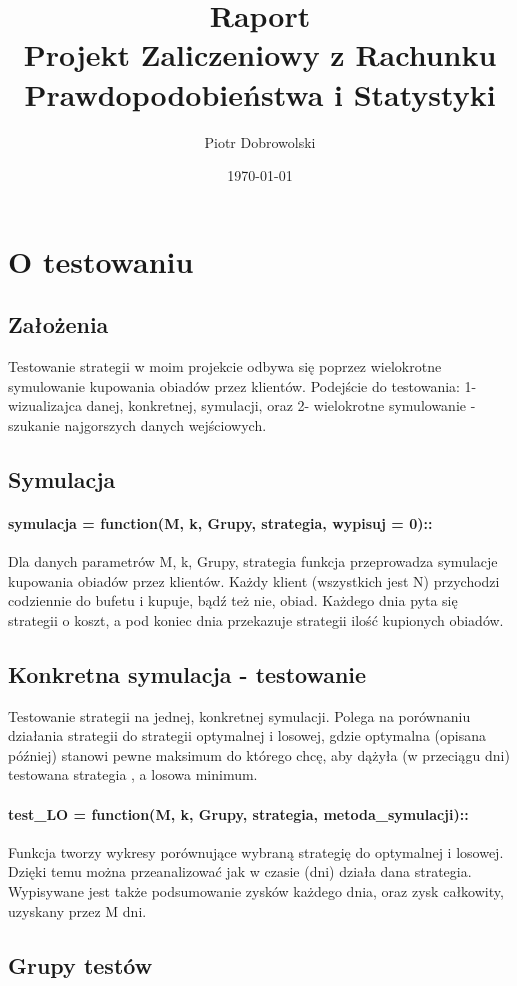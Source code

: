 \documentclass{article}
\author{Piotr Dobrowolski}
\title{Raport \\{\small Projekt Zaliczeniowy z Rachunku Prawdopodobieństwa i Statystyki} }
\date{\today}
\begin{document}
\maketitle
\tableofcontents
\section{O testowaniu}
\subsection{Założenia}
Testowanie strategii w moim projekcie odbywa się poprzez wielokrotne symulowanie kupowania
obiadów przez klientów. Podejście do testowania: 1-wizualizajca danej, konkretnej, symulacji, oraz 2-
wielokrotne symulowanie - szukanie najgorszych danych wejściowych.
\subsection{Symulacja}
\paragraph{symulacja = function(M, k, Grupy, strategia, wypisuj = 0)::} Dla danych parametrów M, k, Grupy, strategia
funkcja przeprowadza symulacje kupowania obiadów przez klientów. Każdy klient (wszystkich jest N) przychodzi codziennie
do bufetu i kupuje, bądź też nie, obiad. Każdego dnia pyta się strategii o koszt, a pod koniec dnia przekazuje
strategii ilość kupionych obiadów.
\subsection{Konkretna symulacja - testowanie}
Testowanie strategii na jednej, konkretnej symulacji. Polega na porównaniu działania strategii do strategii optymalnej
i losowej, gdzie optymalna (opisana później) stanowi pewne maksimum do którego chcę, aby dążyła (w przeciągu dni) testowana strategia
, a losowa minimum. 
\paragraph{test\_LO = function(M, k, Grupy, strategia, metoda\_symulacji)::} Funkcja tworzy wykresy porównujące wybraną
strategię do optymalnej i losowej. Dzięki temu można przeanalizować jak w czasie (dni) działa dana strategia. Wypisywane jest także
podsumowanie zysków każdego dnia, oraz zysk całkowity, uzyskany przez M dni.
\subsection{Grupy testów}
\end{document}
